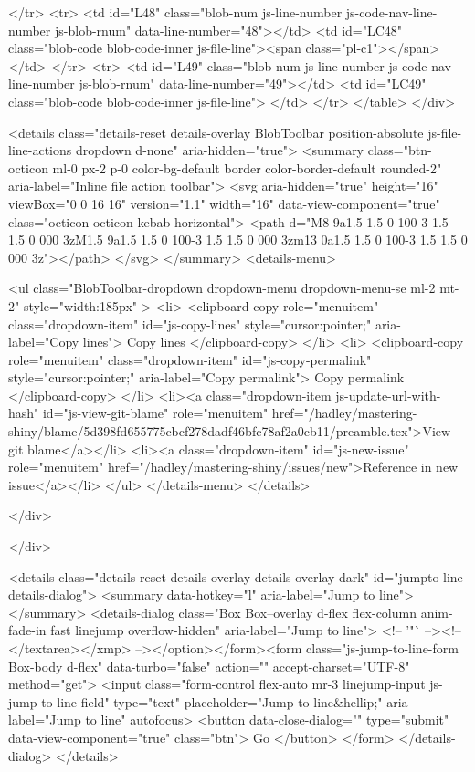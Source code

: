         </tr>
        <tr>
          <td id="L48" class="blob-num js-line-number js-code-nav-line-number js-blob-rnum" data-line-number="48"></td>
          <td id="LC48" class="blob-code blob-code-inner js-file-line"><span class="pl-c1">\makeatother</span></td>
        </tr>
        <tr>
          <td id="L49" class="blob-num js-line-number js-code-nav-line-number js-blob-rnum" data-line-number="49"></td>
          <td id="LC49" class="blob-code blob-code-inner js-file-line">
</td>
        </tr>
  </table>
</div>

  <details class="details-reset details-overlay BlobToolbar position-absolute js-file-line-actions dropdown d-none" aria-hidden="true">
    <summary class="btn-octicon ml-0 px-2 p-0 color-bg-default border color-border-default rounded-2" aria-label="Inline file action toolbar">
      <svg aria-hidden="true" height="16" viewBox="0 0 16 16" version="1.1" width="16" data-view-component="true" class="octicon octicon-kebab-horizontal">
    <path d="M8 9a1.5 1.5 0 100-3 1.5 1.5 0 000 3zM1.5 9a1.5 1.5 0 100-3 1.5 1.5 0 000 3zm13 0a1.5 1.5 0 100-3 1.5 1.5 0 000 3z"></path>
</svg>
    </summary>
    <details-menu>

      <ul class="BlobToolbar-dropdown dropdown-menu dropdown-menu-se ml-2 mt-2"
      style="width:185px"
      >
        <li>
          <clipboard-copy role="menuitem" class="dropdown-item" id="js-copy-lines" style="cursor:pointer;" aria-label="Copy lines">
            Copy lines
          </clipboard-copy>
        </li>
        <li>
          <clipboard-copy role="menuitem" class="dropdown-item" id="js-copy-permalink" style="cursor:pointer;" aria-label="Copy permalink">
            Copy permalink
          </clipboard-copy>
        </li>
        <li><a class="dropdown-item js-update-url-with-hash" id="js-view-git-blame" role="menuitem" href="/hadley/mastering-shiny/blame/5d398fd655775cbcf278dadf46bfc78af2a0cb11/preamble.tex">View git blame</a></li>
          <li><a class="dropdown-item" id="js-new-issue" role="menuitem" href="/hadley/mastering-shiny/issues/new">Reference in new issue</a></li>
      </ul>
    </details-menu>
  </details>

    </div>

    </div>


  

  <details class="details-reset details-overlay details-overlay-dark" id="jumpto-line-details-dialog">
    <summary data-hotkey="l" aria-label="Jump to line"></summary>
    <details-dialog class="Box Box--overlay d-flex flex-column anim-fade-in fast linejump overflow-hidden" aria-label="Jump to line">
      <!-- '"` --><!-- </textarea></xmp> --></option></form><form class="js-jump-to-line-form Box-body d-flex" data-turbo="false" action="" accept-charset="UTF-8" method="get">
        <input class="form-control flex-auto mr-3 linejump-input js-jump-to-line-field" type="text" placeholder="Jump to line&hellip;" aria-label="Jump to line" autofocus>
          <button data-close-dialog="" type="submit" data-view-component="true" class="btn">    Go
</button>
</form>    </details-dialog>
  </details>



